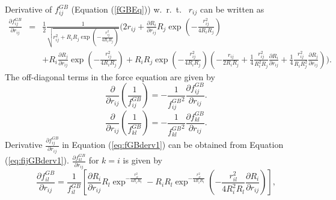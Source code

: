 \documentclass[12pt]{article}
\begin{document}
Derivative of $f_{ij}^{GB}$ (Equation (\ref{fGBEq})) w.~r.~t.~ $r_{ij}$ can be written as
\begin{eqnarray}
\label{eq:fijGBderv1}
\frac{\partial f_{ij}^{GB}}{\partial r_{ij}} & = & \frac{1}{2}\frac{1}{\sqrt{r_{ij}^{2} + R_{i}R_{j}\exp(-\frac{r_{ij}^{2}}{4R_{i}R_{j}})}}(2r_{ij} + \frac{\partial R_{i}}{\partial r_{ij}}R_{j}\exp(-\frac{r_{ij}^{2}}{4R_{i}R_{j}}) \\ \nonumber
& & + R_{i} \frac{\partial R_{j}}{\partial r_{ij}}\exp(-\frac{r_{ij}^{2}}{4R_{i}R_{j}}) + R_{i}R_{j}\exp(-\frac{r_{ij}^{2}}{4R_{i}R_{j}})\left( -\frac{r_{ij}}{2R_{i}R_{j}} + \frac{1}{4}\frac{r_{ij}^{2}}{R_{i}^{2}R_{j}}\frac{\partial R_{i}}{\partial r_{ij}} + \frac{1}{4}\frac{r_{ij}^{2}}{R_{i}R_{j}^{2}}\frac{\partial R_{j}}{\partial r_{ij}}\right)).
\end{eqnarray}
The off-diagonal terms in the force equation are given by
\begin{equation}
\label{eq:fGBderv1}
\frac{\partial}{\partial r_{ij}}\left(\frac{1}{f_{ij}^{GB}} \right) = -\frac{1}{{f_{ij}^{GB}}^{2}} \frac{\partial f_{ij}^{GB}}{\partial r_{ij}}.
\end{equation}
\begin{equation}
\label{eq:fGBderv1}
\frac{\partial}{\partial r_{ij}}\left(\frac{1}{f_{kl}^{GB}} \right) = -\frac{1}{{f_{kl}^{GB}}^{2}} \frac{\partial f_{kl}^{GB}}{\partial r_{ij}}.
\end{equation}
Derivative $\frac{\partial f_{ij}^{GB}}{\partial r_{ij}}$ in Equation (\ref{eq:fGBderv1}) can be obtained from 
Equation (\ref{eq:fijGBderv1}).
$\frac{\partial f_{kl}^{GB}}{\partial r_{ij}}$ for $k=i$ is given by
\begin{equation}
\label{eq:fklGBderv1}
\frac{\partial f_{il}^{GB}}{\partial r_{ij}} = \frac{1}{f_{il}^{GB}} \left[\frac{\partial R_{i}}{\partial r_{ij}}R_{l}\exp^{-\frac{r_{il}^{2}}{4R_{i}R_{l}}} - R_{i}R_{l}\exp^{-\frac{r_{il}^{2}}{4R_{i}R_{l}}}(-\frac{r_{il}^{2}}{4R_{i}^{2}R_{l}}\frac{\partial R_{i}}{\partial r_{ij}})\right],
\end{equation}
\end{document}
